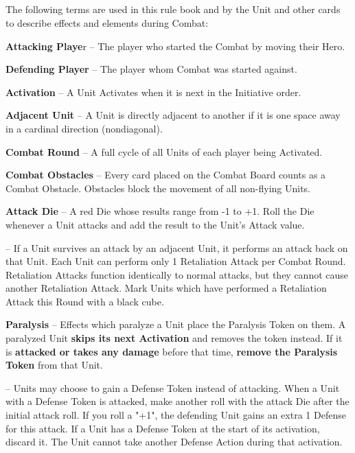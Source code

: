 \begin{multicols}{2}
\subsection*{}
The following terms are used in this rule book and by the Unit and other cards to describe effects and elements during Combat:\par
\textbf{Attacking Playe}r – The player who started the Combat by moving their Hero.\par
\textbf{Defending Player} – The player whom Combat was started against.\par
\textbf{Activation} – A Unit Activates when it is next in the Initiative order.\par
\textbf{Adjacent Unit} – A Unit is directly adjacent to another if it is one space away in a cardinal direction (nondiagonal).\par
\textbf{Combat Round} – A full cycle of all Units of each player being Activated.\par
\textbf{Combat Obstacles} – Every card placed on the Combat Board counts as a Combat Obstacle.
Obstacles block the movement of all non-flying Units.\par
\textbf{Attack Die} – A red Die whose results range from -1 to +1.
Roll the Die whenever a Unit attacks and
add the result to the Unit's Attack value.\par
\textbf{} – If a Unit survives an attack by an adjacent Unit, it performs an attack back on that Unit.
Each Unit can perform only 1 Retaliation Attack per Combat Round.
Retaliation Attacks function identically to normal attacks, but they cannot cause another Retaliation Attack.
Mark Units which have performed a Retaliation Attack this Round with a black cube.\par
\textbf{Paralysis}  – Effects which paralyze a Unit place the Paralysis Token on them.
A paralyzed Unit \textbf{skips its next Activation} and removes the token instead.
If it is \textbf{attacked or takes any damage} before that time, \textbf{remove the Paralysis Token} from that Unit.\par
\textbf{}  – Units may choose to gain a Defense Token instead of attacking.
When a Unit with a Defense Token is attacked, make another roll with the attack Die after the initial attack roll.
If you roll a "+1", the defending Unit gains an extra 1 Defense for this attack.
If a Unit has a Defense Token at the start of its activation, discard it.
The Unit cannot take another Defense Action during that activation.


\end{multicols}
